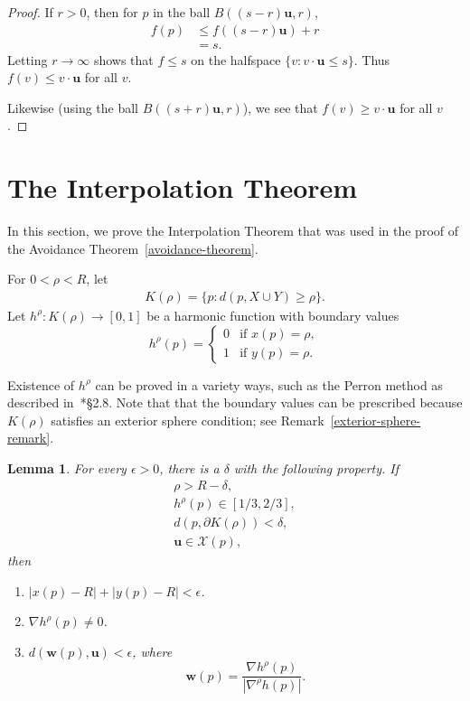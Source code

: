 \documentclass{amsart}
\newcommand{\eps}{\epsilon}
\newcommand{\Xx}{\mathcal{X}}
\newcommand{\ww}{\mathbf w}
\newcommand{\uu}{\mathbf{u}}
\newtheorem{lemma}      [theorem]       {Lemma}
\theoremstyle{definition}
\theoremstyle{definition}
\begin{document}
\begin{proof}
If $r>0$, then for $p$ in the ball $B((s-r)\uu,r)$,
\begin{align*}
f(p)
&\le f((s-r)\uu) + r  \\
&= s.
\end{align*}
Letting $r\to\infty$ shows that $f\le s$ on the halfspace $\{v:v\cdot\uu\le s\}$.
Thus $f(v)\le v\cdot\uu$ for all $v$.

Likewise (using the ball $B((s+r)\uu,r)$), we see that $f(v)\ge v\cdot\uu$
for all $v$.
\end{proof}
















 
\section{The Interpolation Theorem}\label{interpolation-section}

In this section, we prove the Interpolation Theorem that was used
in the proof of the Avoidance Theorem~\ref{avoidance-theorem}.


For $0<\rho<R$, let
\begin{gather*}
  K(\rho)= \{p: d(p,X\cup Y) \ge \rho\}.
\end{gather*}
Let $h^\rho:K(\rho)\to [0,1]$ be a harmonic function with boundary values
\[
h^\rho(p)
=
\begin{cases}
0 &\text{if $x(p)=\rho$},  \\
1 &\text{if $y(p)=\rho$}.
\end{cases}
\]

Existence of $h^\rho$ can be proved in a variety ways, such as the Perron method
as described in~\cite{GT}*{\S 2.8}.
Note that that the boundary values can be prescribed because $K(\rho)$ satisfies
an exterior sphere condition; see Remark~\ref{exterior-sphere-remark}.

\begin{lemma}\label{harmonic-lemma}
For every $\eps>0$, there is a $\delta$ with the following property.
If
\begin{gather*}
\rho>R-\delta, \\
h^\rho(p)\in [1/3,2/3], \\
d(p,\partial K(\rho))<\delta,  \\
\uu\in \Xx(p),
\end{gather*}
then
\begin{enumerate}
\item $|x(p)-R| + |y(p)-R|<\eps$.
\item $\nabla h^\rho(p)\ne 0$.
\item $d(\ww(p),\uu) < \eps$, where 
\[
  \ww(p) = \frac{\nabla h^\rho(p)}{|\nabla^\rho h(p)|}.
\]
\end{enumerate}
\end{lemma}
\end{document}
